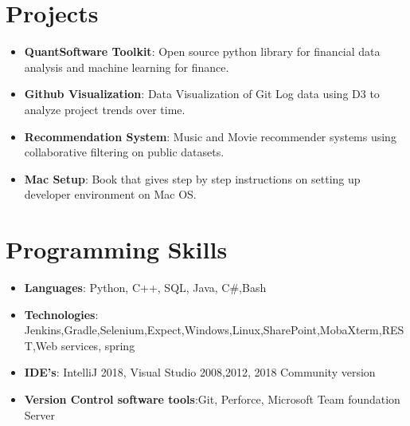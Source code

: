 \documentclass[letterpaper,11pt]{article}
\newcommand{\resumeItem}[2]{
	  \item\small{
	    \textbf{#1}{: #2 \vspace{-2pt}}
	  }
	}
\newcommand{\resumeSubItem}[2]{\resumeItem{#1}{#2}\vspace{-4pt}}
\newcommand{\resumeSubHeadingListStart}{\begin{itemize}[leftmargin=*]}
\newcommand{\resumeSubHeadingListEnd}{\end{itemize}}
\begin{document}
	\section{Projects}
	  \resumeSubHeadingListStart
	    \resumeSubItem{QuantSoftware Toolkit}
	      {Open source python library for financial data analysis and machine learning for finance.}
	    \resumeSubItem{Github Visualization}
	      {Data Visualization of Git Log data using D3 to analyze project trends over time.}
	    \resumeSubItem{Recommendation System}
	      {Music and Movie recommender systems using collaborative filtering on public datasets.}
	    \resumeSubItem{Mac Setup}
	      {Book that gives step by step instructions on setting up developer environment on Mac OS.}
	  \resumeSubHeadingListEnd
	
	
	\section{Programming Skills}
	  \resumeSubHeadingListStart
	    \item{
	      \textbf{Languages}{: Python, C++, SQL, Java, C\#,Bash}
	      \hfill
	    }
    
        \item{
    	      \textbf{Technologies}{: Jenkins,Gradle,Selenium,Expect,Windows,Linux,SharePoint,MobaXterm,REST,Web services, spring}
    	      \hfill
        }
 
         \item{
 	         \textbf{IDE's}{: IntelliJ 2018, Visual Studio 2008,2012, 2018 Community version}
 	         \hfill
             }
    
        \item{
	        \textbf{Version Control software tools}{:Git, Perforce, Microsoft Team foundation Server}
    	    \hfill
        }  
    
	\resumeSubHeadingListEnd
	
	
	
\end{document}
